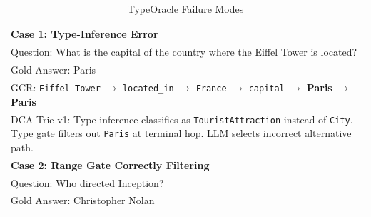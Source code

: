 \begin{table}[H]
  \centering
  \caption[Case Studies Illustrating Non-Monotone Behaviour]{TypeOracle Failure Modes}
  \label{tab:cases}
  \small
  \begin{tabularx}{\textwidth}{|X|}
    \hline
    \textbf{Case 1: Type-Inference Error}                                                                                                                                                                                                       \\
    \hline
    Question: What is the capital of the country where the Eiffel Tower is located?                                                                                                                                                             \\
    Gold Answer: Paris                                                                                                                                                                                                                          \\
    \hline
    GCR: \texttt{Eiffel Tower} $\to$ \texttt{located\_in} $\to$ \texttt{France} $\to$ \texttt{capital} $\to$ \textbf{Paris} $\to$ \textbf{Paris}                                                                                                \\
    \hline
    DCA-Trie v1: Type inference classifies as \texttt{TouristAttraction} instead of \texttt{City}. Type gate filters out \texttt{Paris} at terminal hop. LLM selects incorrect alternative path.                                                \\
    \hline
    \textbf{Case 2: Range Gate Correctly Filtering}                                                                                                                                                                                             \\
    \hline
    Question: Who directed Inception?                                                                                                                                                                                                           \\
    Gold Answer: Christopher Nolan                                                                                                                                                                                                              \\
    \hline

\end{tabularx}
\end{table}
